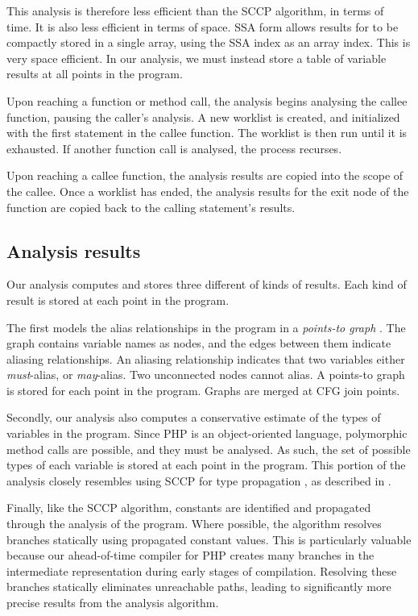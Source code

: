 This analysis is therefore less efficient than the SCCP algorithm, in
terms of time.  It is also less efficient in terms of space.  
SSA form allows results for to be compactly stored in a single array,
using the SSA index as an array index.  This is very space efficient.
In our analysis, we must instead store a table of variable results at
all points in the program.

Upon reaching a function or method call, the analysis begins analysing
the callee function, pausing the caller's analysis.  A new worklist is
created, and initialized with the first statement in the callee
function.  The worklist is then run until it is exhausted.  If another
function call is analysed, the process recurses.

Upon reaching a callee function, the analysis results are copied into
the scope of the callee.  Once a worklist has ended, the analysis
results for the exit node of the function are copied back to the
calling statement's results.

\subsection{Analysis results}

Our analysis computes and stores three different of kinds of results.
Each kind of result is stored at each point in the program.

The first models the alias relationships in the program in a
\textit{points-to graph} \cite{EGH1994}.  The graph contains variable
names as nodes, and the edges between them indicate aliasing
relationships.  An aliasing relationship indicates that two variables
either \textit{must}-alias, or \textit{may}-alias.  Two unconnected
nodes cannot alias.  A points-to graph is stored for each point in the
program.  Graphs are merged at CFG join points.

Secondly, our analysis also computes a conservative estimate of the
types of variables in the program.  Since PHP is an object-oriented
language, polymorphic method calls are possible, and they must be
analysed.  As such, the set of possible types of each variable is
stored at each point in the program.  This portion of the analysis
closely resembles using SCCP for type propagation \cite{Lenart2000},
as described in .

Finally, like the SCCP algorithm, constants are identified and
propagated through the analysis of the program. Where possible, the
algorithm resolves branches statically using propagated constant
values. This is particularly valuable because our \phc ahead-of-time
compiler for PHP creates many branches in the intermediate
representation during early stages of compilation.  Resolving these
branches statically eliminates unreachable paths, leading to
significantly more precise results from the analysis algorithm.


